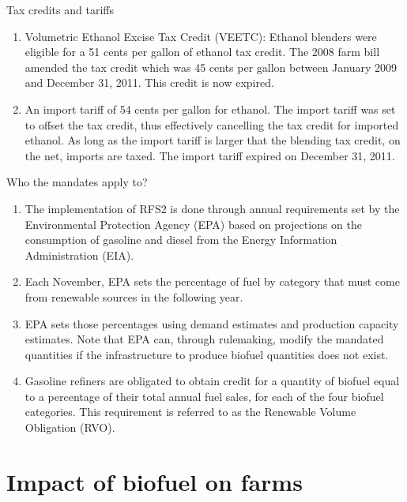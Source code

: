 \documentclass[table,xcolor=pdftex,dvipsnames]{beamer}\usepackage[]{graphicx}\usepackage[]{color}
\begin{document}
\begin{frame}{Tax credits and tariffs}
\begin{enumerate}[label=\textbullet]
    \item Volumetric Ethanol Excise Tax Credit (VEETC): Ethanol blenders were eligible for a 51 cents per gallon of ethanol tax credit. The 2008 farm bill amended the tax credit which was 45 cents per gallon between January 2009 and December 31, 2011. This credit is now expired.
    \item An import tariff of 54 cents per gallon for ethanol. The import tariff was set to offset the tax credit, thus effectively cancelling the tax credit for imported ethanol. As long as the import tariff is larger that the blending tax credit, on the net, imports are taxed. The import tariff expired on December 31, 2011.
\end{enumerate}
\end{frame}



\begin{frame}{Who the mandates apply to?}
\begin{enumerate}[label=\textbullet]
    \item The implementation of RFS2 is done through annual requirements set by the Environmental Protection Agency (EPA) based on projections on the consumption of gasoline and diesel from the Energy Information Administration (EIA).
    \item Each November, EPA sets the percentage of fuel by category that must come from renewable sources in the following year.
    \item EPA sets those percentages using demand estimates and production capacity estimates. Note that EPA can, through rulemaking, modify the mandated quantities if the infrastructure to produce biofuel quantities does not exist.
    \item Gasoline refiners are obligated to obtain credit for a quantity of biofuel equal to a percentage of their total annual fuel sales, for each of the four biofuel categories. This requirement is referred to as the Renewable Volume Obligation (RVO).
\end{enumerate}
\end{frame}


\section{Impact of biofuel on farms}
\end{document}

